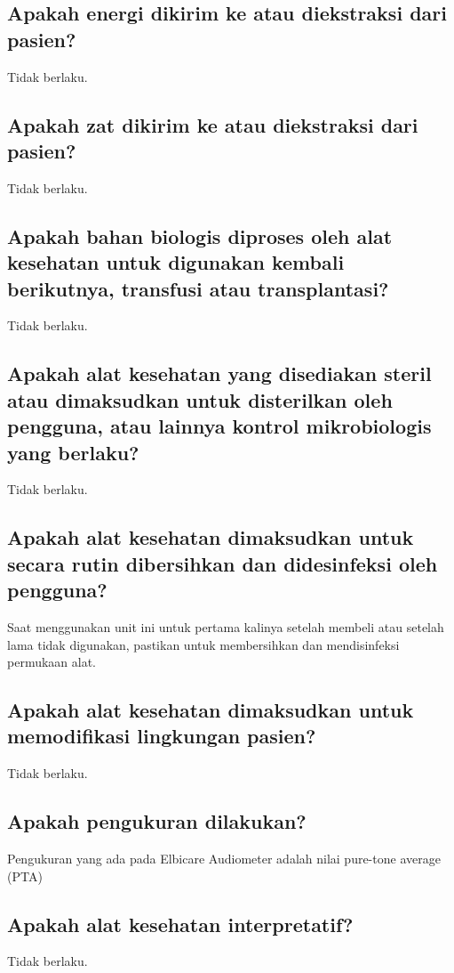 \documentclass[11pt,a4paper,twoside,onecolumn]{book}
\begin{document}
			\subsection{Apakah energi dikirim ke atau diekstraksi dari pasien?}
			Tidak berlaku.
			
			\subsection{Apakah zat dikirim ke atau diekstraksi dari pasien?}
			Tidak berlaku.
			
			\subsection{Apakah bahan biologis diproses oleh alat kesehatan untuk digunakan kembali berikutnya, transfusi atau transplantasi?}
			Tidak berlaku.
			
			\subsection{Apakah alat kesehatan yang disediakan steril atau dimaksudkan untuk disterilkan oleh pengguna, atau lainnya kontrol mikrobiologis yang berlaku?}
			Tidak berlaku.
			
			\subsection{Apakah alat kesehatan dimaksudkan untuk secara rutin dibersihkan dan didesinfeksi oleh pengguna?}
			Saat menggunakan unit ini untuk pertama kalinya setelah membeli atau setelah lama tidak digunakan, pastikan untuk membersihkan dan mendisinfeksi permukaan alat. 
			
			\subsection{Apakah alat kesehatan dimaksudkan untuk memodifikasi lingkungan pasien?}
			Tidak berlaku.
			
			\subsection{Apakah pengukuran dilakukan?}
			Pengukuran yang ada pada Elbicare Audiometer adalah nilai pure-tone average (PTA)
			
			\subsection{Apakah alat kesehatan interpretatif?}
			Tidak berlaku.
			
\end{document}
